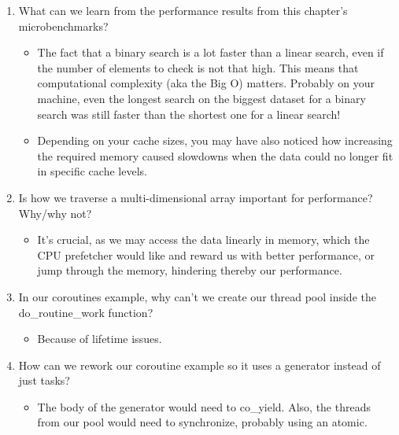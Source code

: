 \begin{enumerate}
\item
What can we learn from the performance results from this chapter's microbenchmarks?
\begin{itemize}
\item 
The fact that a binary search is a lot faster than a linear search, even if the number of elements to check is not that high. This means that computational complexity (aka the Big O) matters. Probably on your machine, even the longest search on the biggest dataset for a binary search was still faster than the shortest one for a linear search!

\item 
Depending on your cache sizes, you may have also noticed how increasing the required memory caused slowdowns when the data could no longer fit in specific cache levels.
\end{itemize}

\item
Is how we traverse a multi-dimensional array important for performance? Why/why not?
\begin{itemize}
\item 
It's crucial, as we may access the data linearly in memory, which the CPU prefetcher would like and reward us with better performance, or jump through the memory, hindering thereby our performance.
\end{itemize}

\item
In our coroutines example, why can't we create our thread pool inside the do\_routine\_work function?
\begin{itemize}
\item 
Because of lifetime issues.
\end{itemize}

\item
How can we rework our coroutine example so it uses a generator instead of just tasks?
\begin{itemize}
\item 
The body of the generator would need to co\_yield. Also, the threads from our pool would need to synchronize, probably using an atomic.
\end{itemize}
\end{enumerate}